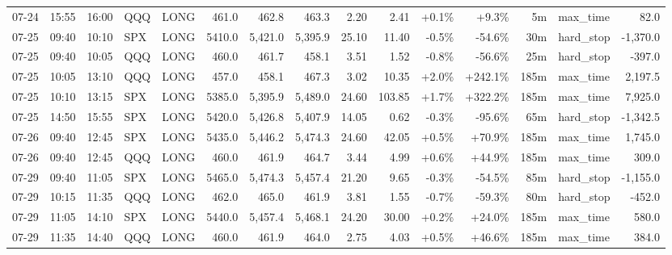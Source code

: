\documentclass[11pt,a4paper,twoside]{article}
\begin{document}
\begin{landscape}
\begin{center}
\begin{longtable}{>{\color{txtmain}}l l l l l r r r r r r r r >{\color{txtmain}}l r}
07-24 & 15:55 & 16:00 & QQQ & LONG & 461.0 & 462.8 & 463.3 & 2.20 & 2.41 & \textcolor{wingreen}{+0.1\%} & \textcolor{wingreen}{+9.3\%} & 5m & max\_time & \textcolor{wingreen}{82.0} \\
07-25 & 09:40 & 10:10 & SPX & LONG & 5410.0 & 5,421.0 & 5,395.9 & 25.10 & 11.40 & \textcolor{lossred}{-0.5\%} & \textcolor{lossred}{-54.6\%} & 30m & hard\_stop & \textcolor{lossred}{-1,370.0} \\
07-25 & 09:40 & 10:05 & QQQ & LONG & 460.0 & 461.7 & 458.1 & 3.51 & 1.52 & \textcolor{lossred}{-0.8\%} & \textcolor{lossred}{-56.6\%} & 25m & hard\_stop & \textcolor{lossred}{-397.0} \\
07-25 & 10:05 & 13:10 & QQQ & LONG & 457.0 & 458.1 & 467.3 & 3.02 & 10.35 & \textcolor{wingreen}{+2.0\%} & \textcolor{wingreen}{+242.1\%} & 185m & max\_time & \textcolor{wingreen}{2,197.5} \\
07-25 & 10:10 & 13:15 & SPX & LONG & 5385.0 & 5,395.9 & 5,489.0 & 24.60 & 103.85 & \textcolor{wingreen}{+1.7\%} & \textcolor{wingreen}{+322.2\%} & 185m & max\_time & \textcolor{wingreen}{7,925.0} \\
07-25 & 14:50 & 15:55 & SPX & LONG & 5420.0 & 5,426.8 & 5,407.9 & 14.05 & 0.62 & \textcolor{lossred}{-0.3\%} & \textcolor{lossred}{-95.6\%} & 65m & hard\_stop & \textcolor{lossred}{-1,342.5} \\
07-26 & 09:40 & 12:45 & SPX & LONG & 5435.0 & 5,446.2 & 5,474.3 & 24.60 & 42.05 & \textcolor{wingreen}{+0.5\%} & \textcolor{wingreen}{+70.9\%} & 185m & max\_time & \textcolor{wingreen}{1,745.0} \\
07-26 & 09:40 & 12:45 & QQQ & LONG & 460.0 & 461.9 & 464.7 & 3.44 & 4.99 & \textcolor{wingreen}{+0.6\%} & \textcolor{wingreen}{+44.9\%} & 185m & max\_time & \textcolor{wingreen}{309.0} \\
07-29 & 09:40 & 11:05 & SPX & LONG & 5465.0 & 5,474.3 & 5,457.4 & 21.20 & 9.65 & \textcolor{lossred}{-0.3\%} & \textcolor{lossred}{-54.5\%} & 85m & hard\_stop & \textcolor{lossred}{-1,155.0} \\
07-29 & 10:15 & 11:35 & QQQ & LONG & 462.0 & 465.0 & 461.9 & 3.81 & 1.55 & \textcolor{lossred}{-0.7\%} & \textcolor{lossred}{-59.3\%} & 80m & hard\_stop & \textcolor{lossred}{-452.0} \\
07-29 & 11:05 & 14:10 & SPX & LONG & 5440.0 & 5,457.4 & 5,468.1 & 24.20 & 30.00 & \textcolor{wingreen}{+0.2\%} & \textcolor{wingreen}{+24.0\%} & 185m & max\_time & \textcolor{wingreen}{580.0} \\
07-29 & 11:35 & 14:40 & QQQ & LONG & 460.0 & 461.9 & 464.0 & 2.75 & 4.03 & \textcolor{wingreen}{+0.5\%} & \textcolor{wingreen}{+46.6\%} & 185m & max\_time & \textcolor{wingreen}{384.0} \\

\end{longtable}
\end{center}
\end{landscape}
\end{document}

